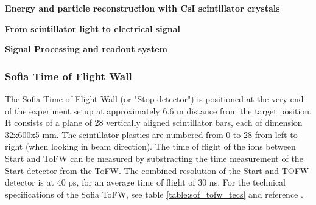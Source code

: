 \textbf{Energy and particle reconstruction with CsI scintillator crystals}

\textbf{From scintillator light to electrical signal}

\textbf{Signal Processing and readout system}
\subsubsection{Sofia Time of Flight Wall}
The Sofia Time of Flight Wall (or "Stop detector") is positioned at the very end of the experiment setup at approximately 6.6 m distance from the target position. It consists of a plane of 28 vertically aligned scintillator bars, each of dimension 32x600x5 mm. The scintillator plastics are numbered from 0 to 28 from left to right (when looking in beam direction). The time of flight of the ions between Start and ToFW can be measured by substracting the time measurement of  the Start detector from the ToFW. The combined resolution of the Start and TOFW detector is at 40 ps, for an average time of flight of 30 ns\cite{martin2021fission}. For the technical specifications of the Sofia ToFW, see table \ref{table:sof_tofw_tecs} and reference \cite{bail2011time}.
\begin{figure}
\begin{floatrow}
\end{floatrow}
\end{figure}

